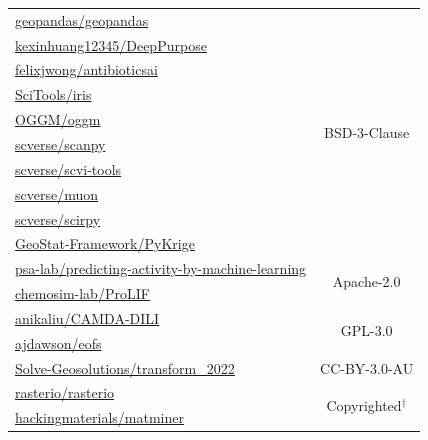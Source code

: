 \begin{table}[h]
\begin{tabular}{lc}
\href{https://github.com/geopandas/geopandas}{geopandas/geopandas} & \multirow{10}{*}{BSD-3-Clause} \\
\href{https://github.com/kexinhuang12345/DeepPurpose}{kexinhuang12345/DeepPurpose} &  \\
\href{https://github.com/felixjwong/antibioticsai}{felixjwong/antibioticsai} & \\
\href{https://github.com/SciTools/iris}{SciTools/iris} & \\
\href{https://github.com/OGGM/oggm}{OGGM/oggm} & \\
\href{https://github.com/scverse/scanpy}{scverse/scanpy} & \\
\href{https://github.com/scverse/scvi-tools}{scverse/scvi-tools} & \\
\href{https://github.com/scverse/muon}{scverse/muon} & \\
\href{https://github.com/scverse/scirpy}{scverse/scirpy} & \\
\href{https://github.com/GeoStat-Framework/PyKrige}{GeoStat-Framework/PyKrige} & \\
\midrule

\href{https://github.com/psa-lab/predicting-activity-by-machine-learning}{psa-lab/predicting-activity-by-machine-learning} & \multirow{2}{*}{Apache-2.0} \\
\href{https://github.com/chemosim-lab/ProLIF}{chemosim-lab/ProLIF} & \\
\midrule

\href{https://github.com/anikaliu/CAMDA-DILI}{anikaliu/CAMDA-DILI} & \multirow{2}{*}{GPL-3.0} \\
\href{https://github.com/ajdawson/eofs}{ajdawson/eofs} & \\
\midrule

\href{https://github.com/Solve-Geosolutions/transform_2022}{Solve-Geosolutions/transform\_2022} & CC-BY-3.0-AU \\
\midrule

\href{https://github.com/rasterio/rasterio}{rasterio/rasterio} & \multirow{2}{*}{Copyrighted$^\dag$} \\
\href{https://github.com/hackingmaterials/matminer}{hackingmaterials/matminer} &  \\

\bottomrule
\end{tabular}

\vspace{-11pt}
\label{tab:repos}
\end{table}